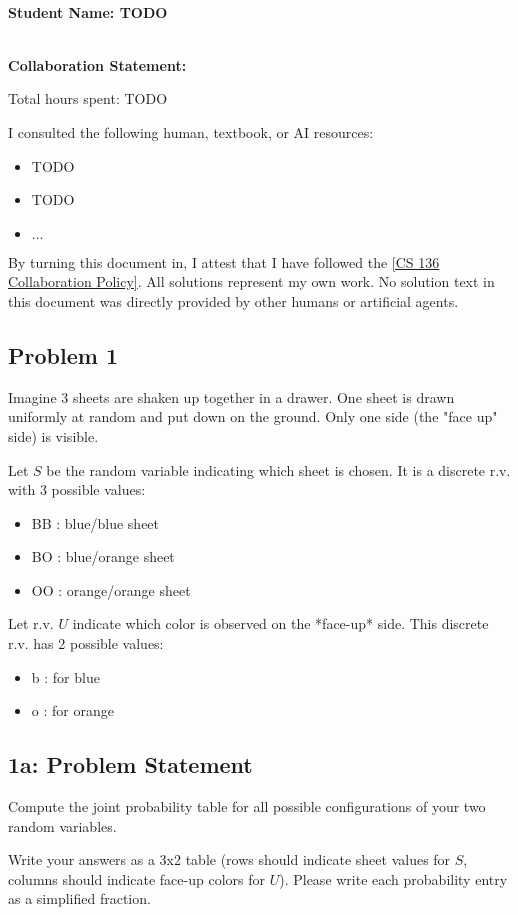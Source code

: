 \documentclass[10pt]{article}
\newcommand{\officialdirections}[1]{{\color{purple} #1}}
\begin{document}
~\\ %

{\Large{\bf Student Name: TODO}}

~\\ %
{\bf Collaboration Statement:}

Total hours spent: TODO

I consulted the following human, textbook, or AI resources:
\begin{itemize}
\item TODO
\item TODO
\item $\ldots$	
\end{itemize}

By turning this document in, I attest that I have followed the 
\href{https://www.cs.tufts.edu/cs/136/2025f/index.html#collaboration}{[CS 136 Collaboration Policy]}. All solutions represent my own work. No solution text in this document was directly provided by other humans or artificial agents. 

\tableofcontents

\newpage
\officialdirections{
\subsection*{Problem 1}
Imagine 3 sheets are shaken up together in a drawer. One sheet is drawn uniformly at random and put down on the ground. Only one side (the "face up" side) is visible.

Let $S$ be the random variable indicating which sheet is chosen. It is a discrete r.v. with 3 possible values:

\begin{itemize}
    \item BB : blue/blue sheet
    \item BO : blue/orange sheet
    \item OO : orange/orange sheet
\end{itemize}

Let r.v. $U$ indicate which color is observed on the *face-up* side. This discrete r.v. has 2 possible values:

\begin{itemize}
    \item b : for blue
    \item o : for orange
\end{itemize}

}

\officialdirections{
\subsection*{1a: Problem Statement}
Compute the joint probability table for all possible configurations of your two random variables.

Write your answers as a 3x2 table (rows should indicate sheet values for $S$, columns should indicate face-up colors for $U$). Please write each probability entry as a simplified fraction.
}
\end{document}
